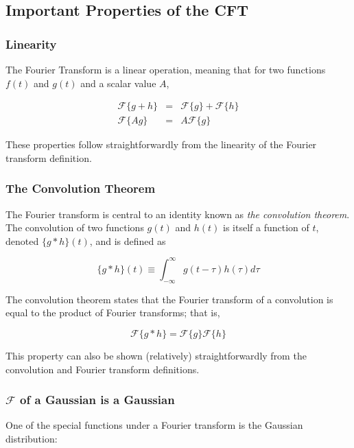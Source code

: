 \documentclass[preprint]{aastex}
\begin{document}
\subsection{Important Properties of the CFT}

\subsubsection{Linearity}
The Fourier Transform is a linear operation, meaning that for two functions $f(t)$ and $g(t)$ and a scalar value $A$,

\begin{eqnarray}
  \mathcal{F}\{g + h\} &=& \mathcal{F}\{g\} + \mathcal{F}\{h\}\\
  \mathcal{F}\{A g\} &=& A\mathcal{F}\{g\}
\end{eqnarray}

These properties follow straightforwardly from the linearity of the Fourier transform definition.

\subsubsection{The Convolution Theorem}

The Fourier transform is central to an identity known as {\it the convolution theorem}.
The convolution of two functions $g(t)$ and $h(t)$ is itself a function of $t$, denoted $\{g \ast h\}(t)$, and is defined as

\begin{equation}
  \{g \ast h\}(t) \equiv \int_{-\infty}^\infty g(t - \tau) h(\tau) d\tau
\end{equation}

The convolution theorem states that the Fourier transform of a convolution is equal to the product of Fourier transforms; that is,

\begin{equation}
  \mathcal{F}\{g \ast h\} = \mathcal{F}\{g\}\mathcal{F}\{h\}
\end{equation}

This property can also be shown (relatively) straightforwardly from the convolution and Fourier transform definitions.

\subsubsection{$\mathcal{F}$ of a Gaussian is a Gaussian}
One of the special functions under a Fourier transform is the Gaussian distribution:
\end{document}
